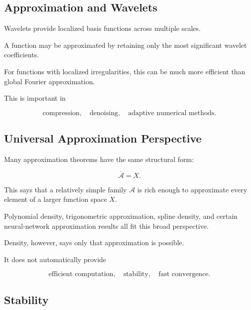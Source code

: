 \subsection{Approximation and Wavelets}
\label{subsec:approximation-wavelets}

Wavelets provide localized basis functions across multiple scales.

A function may be approximated by retaining only the most significant
wavelet coefficients.

For functions with localized irregularities, this can be much more
efficient than global Fourier approximation.

This is important in

\[
\boxed{
\text{compression},
\quad
\text{denoising},
\quad
\text{adaptive numerical methods}.
}
\]

\subsection{Universal Approximation Perspective}
\label{subsec:universal-approximation-perspective}

Many approximation theorems have the same structural form:

\[
\boxed{
\overline{\mathcal{A}}=X.
}
\]

This says that a relatively simple family \(\mathcal{A}\) is rich enough
to approximate every element of a larger function space \(X\).

Polynomial density, trigonometric approximation, spline density, and
certain neural-network approximation results all fit this broad
perspective.

Density, however, says only that approximation is possible.

It does not automatically provide

\[
\boxed{
\text{efficient computation},
\quad
\text{stability},
\quad
\text{fast convergence}.
}
\]

\subsection{Stability}
\label{subsec:approximation-stability}

